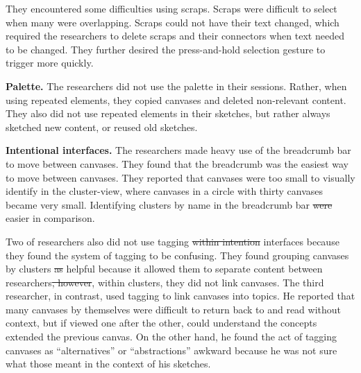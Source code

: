 \documentclass[12pt,fleqn]{ucithesis}
\providecommand{\DIFaddtex}[1]{{\protect\color{blue}\uwave{#1}}} %
\providecommand{\DIFdeltex}[1]{{\protect\color{red}\sout{#1}}}                      %
\providecommand{\DIFaddbegin}{} %
\providecommand{\DIFaddend}{} %
\providecommand{\DIFdelbegin}{} %
\providecommand{\DIFdelend}{} %
\providecommand{\DIFadd}[1]{\texorpdfstring{\DIFaddtex{#1}}{#1}} %
\providecommand{\DIFdel}[1]{\texorpdfstring{\DIFdeltex{#1}}{}} %
\begin{document}
They encountered some difficulties using scraps. Scraps were difficult to select when many were overlapping. Scraps could not have their text changed, which required the researchers to delete scraps and their connectors when text needed to be changed. They further desired the press-and-hold selection gesture to trigger more quickly.
%
%
%
%
%
%
%

\textbf{Palette.} The researchers did not use the palette in their sessions. Rather, when using repeated elements, they copied canvases and deleted non-relevant content. They also did not use repeated elements in their sketches, but rather always sketched new content, or reused old sketches.

\textbf{Intentional interfaces.} The researchers made heavy use of the breadcrumb bar to move between canvases. They found that the breadcrumb was the easiest way to move between canvases. They reported that canvases were too small to visually identify in the cluster-view, where canvases in a circle with thirty canvases became very small. Identifying clusters by name in the breadcrumb bar \DIFdelbegin \DIFdel{were }\DIFdelend \DIFaddbegin \DIFadd{was }\DIFaddend easier in comparison.

Two of researchers also did not use tagging \DIFdelbegin \DIFdel{within intention }\DIFdelend \DIFaddbegin \DIFadd{with intentional }\DIFaddend interfaces because they found the system of tagging to be confusing. They found grouping canvases by clusters \DIFdelbegin \DIFdel{as }\DIFdelend helpful because it allowed them to separate content between researchers\DIFdelbegin \DIFdel{, however}\DIFdelend \DIFaddbegin \DIFadd{. However}\DIFaddend , within clusters, they did not link canvases. The third researcher, in contrast, used tagging to link canvases into topics. He reported that many canvases by themselves were difficult to return back to and read without context, but if viewed one after the other, could understand the concepts extended the previous canvas. On the other hand, he found the act of tagging canvases as ``alternatives'' or ``abstractions'' awkward because he was not sure what those meant in the context of his sketches.
\end{document}
